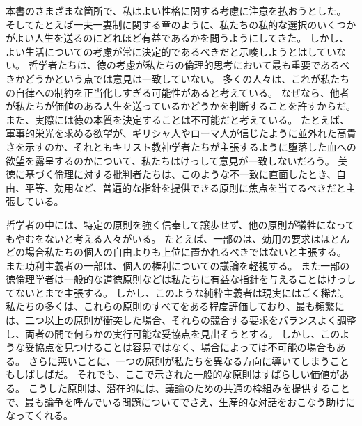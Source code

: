 \documentclass[paper=a4,book,openany]{jlreq}
\begin{document}
本書のさまざまな箇所で、私はよい性格に関する考慮に注意を払おうとした。
そしてたとえば一夫一妻制に関する章のように、私たちの私的な選択のいくつかがよい人生を送るのにどれほど有益であるかを問うようにしてきた。
しかし、よい生活についての考慮が常に決定的であるべきだと示唆しようとはしていない。
哲学者たちは、徳の考慮が私たちの倫理的思考において最も重要であるべきかどうかという点では意見は一致していない。
多くの人々は、これが私たちの自律への制約を正当化しすぎる可能性があると考えている。
なぜなら、他者が私たちが価値のある人生を送っているかどうかを判断することを許すからだ。
また、実際には徳の本質を決定することは不可能だと考えている。
たとえば、軍事的栄光を求める欲望が、ギリシャ人やローマ人が信じたように並外れた高貴さを示すのか、それともキリスト教神学者たちが主張するように堕落した血への欲望を露呈するのかについて、私たちはけっして意見が一致しないだろう。
美徳に基づく倫理に対する批判者たちは、このような不一致に直面したとき、自由、平等、効用など、普遍的な指針を提供できる原則に焦点を当てるべきだと主張している。

\vspace{1\zw}

哲学者の中には、特定の原則を強く信奉して譲歩せず、他の原則が犠牲になってもやむをないと考える人々がいる。
たとえば、一部のは、効用の要求はほとんどの場合私たちの個人の自由よりも上位に置かれるべきではないと主張する。
また功利主義者の一部は、個人の権利についての議論を軽視する。
また一部の徳倫理学者は一般的な道徳原則などは私たちに有益な指針を与えることはけっしてないとまで主張する。
しかし、このような純粋主義者は現実にはごく稀だ。
私たちの多くは、これらの原則のすべてをある程度評価しており、最も頻繁には、二つ以上の原則が衝突した場合、それらの競合する要求をバランスよく調整し、両者の間で何らかの実行可能な妥協点を見出そうとする。
しかし、このような妥協点を見つけることは容易ではなく、場合によっては不可能の場合もある。
さらに悪いことに、一つの原則が私たちを異なる方向に導いてしまうこともしばしばだ。
それでも、ここで示された一般的な原則はすばらしい価値がある。
こうした原則は、潜在的には、議論のための共通の枠組みを提供することで、最も論争を呼んでいる問題についてでさえ、生産的な対話をおこなう助けになってくれる。
\end{document}
